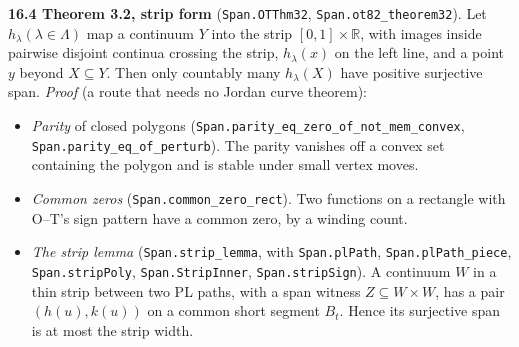 \documentclass[11pt]{article}
\newcommand{\lean}[1]{\texttt{#1}}
\begin{document}
\textbf{16.4 Theorem 3.2, strip form} (\lean{Span.\hspace{0pt}OTThm32}, \lean{Span.\hspace{0pt}ot82\_\hspace{0pt}theorem32}). Let $h_{\lambda} (\lambda \in \Lambda)$ map a continuum $Y$ into the strip $[0, 1] \times \mathbb{R}$, with images inside pairwise disjoint continua crossing the strip, $h_{\lambda}(x)$ on the left line, and a point $y$ beyond $X \subseteq Y$. Then only countably many $h_{\lambda}(X)$ have positive surjective span. \emph{Proof} (a route that needs no Jordan curve theorem):

\begin{itemize}
  \item \emph{Parity} of closed polygons (\lean{Span.\hspace{0pt}parity\_\hspace{0pt}eq\_\hspace{0pt}zero\_\hspace{0pt}of\_\hspace{0pt}not\_\hspace{0pt}mem\_\hspace{0pt}convex}, \lean{Span.\hspace{0pt}parity\_\hspace{0pt}eq\_\hspace{0pt}of\_\hspace{0pt}perturb}). The parity vanishes off a convex set containing the polygon and is stable under small vertex moves.
  \item \emph{Common zeros} (\lean{Span.\hspace{0pt}common\_\hspace{0pt}zero\_\hspace{0pt}rect}). Two functions on a rectangle with O--T's sign pattern have a common zero, by a winding count.
  \item \emph{The strip lemma} (\lean{Span.\hspace{0pt}strip\_\hspace{0pt}lemma}, with \lean{Span.\hspace{0pt}plPath}, \lean{Span.\hspace{0pt}plPath\_\hspace{0pt}piece}, \lean{Span.\hspace{0pt}stripPoly}, \lean{Span.\hspace{0pt}StripInner}, \lean{Span.\hspace{0pt}stripSign}). A continuum $W$ in a thin strip between two PL paths, with a span witness $Z \subseteq W \times W$, has a pair $(h(u), k(u))$ on a common short segment $B_t$. Hence its surjective span is at most the strip width.

\end{itemize}
\end{document}

